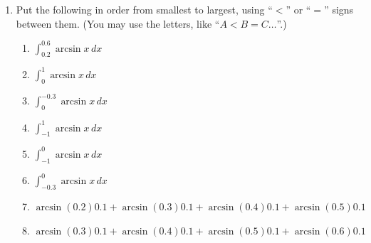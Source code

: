 \documentclass{article}
\begin{document}
\begin{enumerate}
\begin{enumerate}
  \item
    \begin{problem}[\newpage]
      Put the following in order from smallest to largest, using ``$<$''
      or ``$=$'' signs between them.  (You may use the letters, like ``$A
      < B = C \ldots$''.)
      \begin{enumerate}[label=\Alph*.]
      \item $\displaystyle \int_{0.2}^{0.6} \arcsin x\,dx$
      \item $\displaystyle \int_{0}^{1} \arcsin x\,dx$    
      \item $\displaystyle \int_{0}^{-0.3} \arcsin x\,dx$ 
      \item $\displaystyle \int_{-1}^1 \arcsin x\,dx$
      \item $\displaystyle \int_{-1}^0  \arcsin x\,dx$
      \item $\displaystyle \int_{-0.3}^0\arcsin x\,dx$
      \item $\displaystyle \arcsin (0.2) 0.1 + \arcsin (0.3) 0.1
        +\arcsin (0.4) 0.1 +\arcsin (0.5) 0.1$
      \item $\displaystyle \arcsin (0.3) 0.1 +\arcsin (0.4) 0.1 +\arcsin
        (0.5) 0.1+ \arcsin (0.6) 0.1$
      \end{enumerate}      
    \end{problem}


\end{enumerate}
\end{enumerate}
\end{document}
